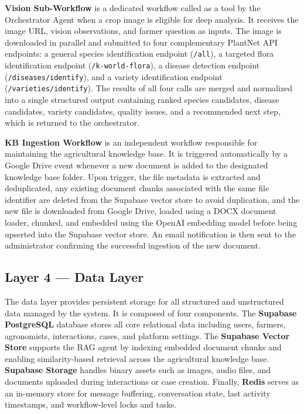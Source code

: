 \textbf{Vision Sub-Workflow} is a dedicated workflow called as a tool by the Orchestrator Agent when a crop image is eligible for deep analysis. It receives the image URL, vision observations, and farmer question as inputs. The image is downloaded in parallel and submitted to four complementary PlantNet API endpoints: a general species identification endpoint (\texttt{/all}), a targeted flora identification endpoint (\texttt{/k-world-flora}), a disease detection endpoint (\texttt{/diseases/identify}), and a variety identification endpoint (\texttt{/varieties/identify}). The results of all four calls are merged and normalized into a single structured output containing ranked species candidates, disease candidates, variety candidates, quality issues, and a recommended next step, which is returned to the orchestrator.

\textbf{KB Ingestion Workflow} is an independent workflow responsible for maintaining the agricultural knowledge base. It is triggered automatically by a Google Drive event whenever a new document is added to the designated knowledge base folder. Upon trigger, the file metadata is extracted and deduplicated, any existing document chunks associated with the same file identifier are deleted from the Supabase vector store to avoid duplication, and the new file is downloaded from Google Drive, loaded using a DOCX document loader, chunked, and embedded using the OpenAI embedding model before being upserted into the Supabase vector store. An email notification is then sent to the administrator confirming the successful ingestion of the new document.

\subsection*{Layer 4 — Data Layer}

The data layer provides persistent storage for all structured and unstructured data managed by the system. It is composed of four components. The \textbf{Supabase PostgreSQL} database stores all core relational data including users, farmers, agronomists, interactions, cases, and platform settings. The \textbf{Supabase Vector Store} supports the RAG agent by indexing embedded document chunks and enabling similarity-based retrieval across the agricultural knowledge base. \textbf{Supabase Storage} handles binary assets such as images, audio files, and documents uploaded during interactions or case creation. Finally, \textbf{Redis} serves as an in-memory store for message buffering, conversation state, last activity timestamps, and workflow-level locks and tasks.

